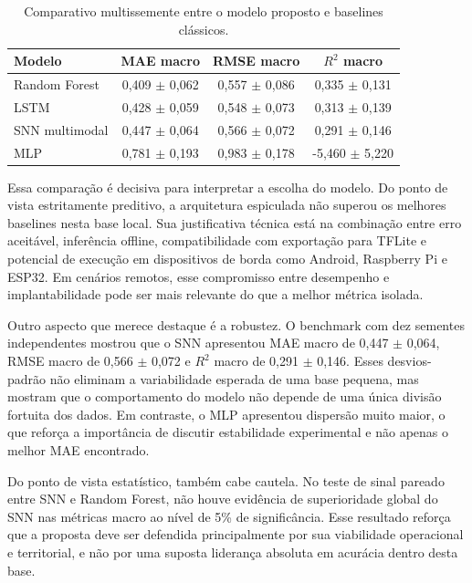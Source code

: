 \begin{table}[H]
\centering
\caption{Comparativo multissemente entre o modelo proposto e baselines cl\'assicos.}
\label{tab:baselines}
\tabelafonte
\begin{tabular}{lccc}
\toprule
Modelo & MAE macro & RMSE macro & $R^2$ macro \\
\midrule
Random Forest & 0,409 $\pm$ 0,062 & 0,557 $\pm$ 0,086 & 0,335 $\pm$ 0,131 \\
LSTM & 0,428 $\pm$ 0,059 & 0,548 $\pm$ 0,073 & 0,313 $\pm$ 0,139 \\
SNN multimodal & 0,447 $\pm$ 0,064 & 0,566 $\pm$ 0,072 & 0,291 $\pm$ 0,146 \\
MLP & 0,781 $\pm$ 0,193 & 0,983 $\pm$ 0,178 & -5,460 $\pm$ 5,220 \\
\bottomrule
\end{tabular}
\end{table}

Essa compara\c{c}\~ao \'e decisiva para interpretar a escolha do modelo. Do ponto de vista estritamente preditivo, a arquitetura espiculada n\~ao superou os melhores baselines nesta base local. Sua justificativa t\'ecnica est\'a na combina\c{c}\~ao entre erro aceit\'avel, infer\^encia offline, compatibilidade com exporta\c{c}\~ao para TFLite e potencial de execu\c{c}\~ao em dispositivos de borda como Android, Raspberry Pi e ESP32. Em cen\'arios remotos, esse compromisso entre desempenho e implantabilidade pode ser mais relevante do que a melhor m\'etrica isolada.

Outro aspecto que merece destaque \'e a robustez. O benchmark com dez sementes independentes mostrou que o SNN apresentou MAE macro de 0,447 $\pm$ 0,064, RMSE macro de 0,566 $\pm$ 0,072 e $R^2$ macro de 0,291 $\pm$ 0,146. Esses desvios-padr\~ao n\~ao eliminam a variabilidade esperada de uma base pequena, mas mostram que o comportamento do modelo n\~ao depende de uma \'unica divis\~ao fortuita dos dados. Em contraste, o MLP apresentou dispers\~ao muito maior, o que refor\c{c}a a import\^ancia de discutir estabilidade experimental e n\~ao apenas o melhor MAE encontrado.

Do ponto de vista estat\'istico, tamb\'em cabe cautela. No teste de sinal pareado entre SNN e Random Forest, n\~ao houve evid\^encia de superioridade global do SNN nas m\'etricas macro ao n\'ivel de 5\% de signific\^ancia. Esse resultado refor\c{c}a que a proposta deve ser defendida principalmente por sua viabilidade operacional e territorial, e n\~ao por uma suposta lideran\c{c}a absoluta em acur\'acia dentro desta base.

